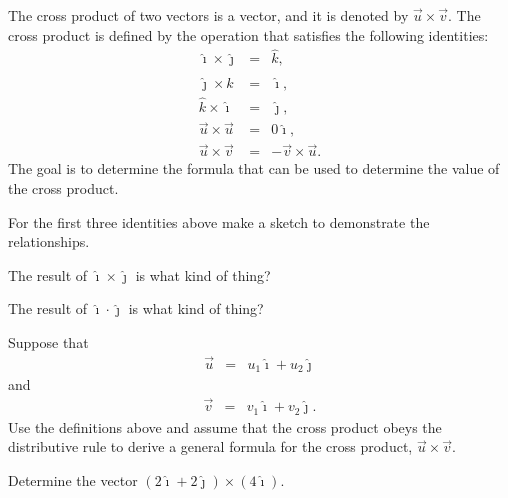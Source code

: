\begin{problem}
\item The cross product of two vectors is a vector, and it is denoted by $\vec{u}\times\vec{v}$.
The cross product is defined by the operation that satisfies the following identities:
  \begin{eqnarray*}
    \hat{\imath} \times \hat{\jmath} & = & \hat{k}, \\
    \hat{\jmath} \times \hat{k} & = & \hat{\imath}, \\
    \hat{k} \times \hat{\imath} & = & \hat{\jmath}, \\
    \vec{u} \times \vec{u} & = & 0 \hat{\imath}, \\
    \vec{u} \times \vec{v} & = & - \vec{v} \times \vec{u}.
  \end{eqnarray*}
  The goal is to determine the formula that can be used to determine the value of the cross product.
  \begin{subproblem}
  \item For the first three identities above make a sketch to
    demonstrate the relationships.
    \vfill

    \item The result of $\hat{\imath}\times\hat{\jmath}$ is what kind of thing?
    \vspace{3em}

    \item The result of $\hat{\imath}\cdot\hat{\jmath}$ is what kind of thing?
    \vspace{3em}

    \clearpage

  \item Suppose that
    \begin{eqnarray*}
      \vec{u} & = & u_1 \hat{\imath} + u_2 \hat{\jmath}
    \end{eqnarray*}
    and
    \begin{eqnarray*}
      \vec{v} & = & v_1 \hat{\imath} + v_2 \hat{\jmath}.
    \end{eqnarray*}
    Use the definitions above and assume that the cross product obeys
    the distributive rule to derive a general formula for the cross
    product, $\vec{u}\times\vec{v}$.
    \vfill
    \vfill

    \clearpage

  \item Determine the vector $\left(2 \hat{\imath} + 2\hat{\jmath}\right) \times \left(4 \hat{\imath}\right)$.
    \vfill


\end{subproblem}
\end{problem}
